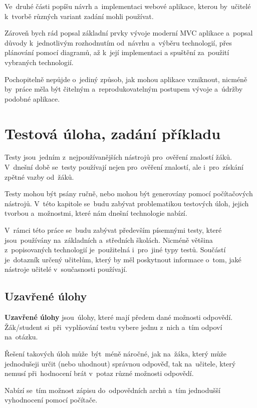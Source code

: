 \documentclass[14pt,a4paper]{article}
\begin{document}
    Ve~druhé části popíšu návrh a~implementaci webové aplikace, kterou by~učitelé k~tvorbě různých variant zadání mohli používat.
    
    Zároveň bych rád popsal základní prvky vývoje moderní \textsc{MVC} aplikace a~popsal důvody k~jednotlivým rozhodnutím od~návrhu
    a~výběru technologií, přes plánování pomocí diagramů, až k~její implementaci a spuštění za~použití vybraných technologií.
    
    Pochopitelně nepůjde o~jediný způsob, jak mohou aplikace vzniknout, nicméně by~práce měla být čitelným a~reprodukovatelným postupem vývoje
    a~údržby podobné aplikace.

    \section{Testová úloha, zadání příkladu}
    
    Testy jsou~jedním z~nejpoužívanějších nástrojů pro~ověření znalostí žáků. V~dnešní době se~testy používají nejen pro~ověření znalostí, ale i~pro~získání zpětné vazby od~žáků.
    
    Testy mohou být psány ručně, nebo mohou být generovány pomocí počítačových nástrojů. V~této kapitole se~budu zabývat problematikou testových úloh, jejich tvorbou a~možnostmi, které nám dnešní technologie nabízí.

    V~rámci této práce se~budu zabývat především písemnými testy, které jsou~používány na~základních a~středních školách. Nicméně většina z~popisovaných technologií je~použitelná i~pro~jiné typy testů. Součástí je~dotazník určený učitelům, který by měl poskytnout informace o~tom, jaké nástroje učitelé v~současnosti používají.

        \subsection{Uzavřené úlohy}
        
        \textbf{Uzavřené úlohy} jsou~úlohy, které mají předem dané možnosti odpovědí. Žák/student si~při~vyplňování testu vybere jednu z~nich a~tím odpoví na~otázku.

        Řešení takových úloh může~být~méně náročné, jak na~žáka, který může jednodušeji určit (nebo uhodnout) správnou odpověď, tak na~učitele, který nemusí při~hodnocení brát v~potaz různé možnosti odpovědí.

        Nabízí se~tím možnost zápisu do~odpovědních archů a~tím jednodušší vyhodnocení pomocí počítače.
\end{document}
